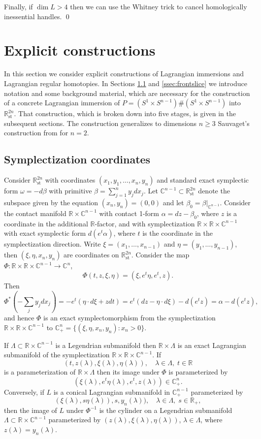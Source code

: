 \documentclass[reqno,11pt]{amsart}
\numberwithin{equation}{section}
\theoremstyle{my}
\theoremstyle{my}
\theoremstyle{your}
\newcommand{\R}{\mathbb{R}}
\newcommand{\C}{\mathbb{C}}
\newcommand{\st}{\mathrm{st}}
\begin{document}
Finally, if $\dim L > 4$ then we can use the Whitney trick to cancel homologically inessential handles.
\qed

\appendix
\section{Explicit constructions}\label{Sec:explicit}
In this section we consider explicit constructions of  Lagrangian immersions and Lagrangian regular homotopies. In Sections \ref{ssec:symplcoord} and \ref{ssec:frontslice} we introduce notation and some background material, which are necessary for the construction of a concrete Lagrangian immersion of $P=(S^{1}\times S^{n-1})\#(S^{1}\times S^{n-1})$ into $\R^{2n}_{\st}$. That construction, which is broken down into five stages, is given in the subsequent sections.  The construction generalizes  to dimensions $n\geq 3$ Sauvaget's construction from \cite{Sauvaget} for $n=2$. 


\subsection{Symplectization coordinates}\label{ssec:symplcoord}
Consider $\R^{2n}_\st$ with coordinates $(x_1,y_1,\dots, x_n,y_n)$ and standard exact symplectic form $\omega = -d\beta$ with primitive $\beta=\sum_{j=1}^{n} y_j dx_j$. Let $\C^{n-1}\subset \R^{2n}_\st$ denote the subspace given by the equation $(x_n,y_n)=(0,0)$ and let $\beta_0=\beta|_{\C^{n-1}}$. Consider the contact manifold $\R\times\C^{n-1}$ with contact 1-form $\alpha=dz-\beta_0$, where $z$ is a coordinate in the additional $\R$-factor, and with symplectization $\R\times\R\times\C^{n-1}$ with exact symplectic form $d(e^{t}\alpha)$, where $t$ is the coordinate in the symplectization direction. Write $\xi=(x_1,\dots,x_{n-1})$ and $\eta=(y_1,\dots,y_{n-1})$, then $(\xi,\eta,x_n,y_n)$ are coordinates on $\R^{2n}_\st$. Consider the map $\Phi\colon \R\times\R\times\C^{n-1}\to\C^{n}$,
\[
\Phi(t,z,\xi,\eta)=(\xi,e^{t}\eta,e^t,z).
\]
Then
\[
\Phi^{\ast}(-\sum_{j}y_jdx_j)=-e^{t}(\eta\cdot d\xi +zdt)=e^{t}(dz-\eta\cdot d\xi)-d(e^{t}z)=\alpha-d(e^{t}z),
\] 
and hence $\Phi$ is an exact symplectomorphism from the symplectization $\R\times\R\times\C^{n-1}$ to $\C^{n}_{+}=\{(\xi,\eta,x_n,y_n)\colon x_n>0\}$. 

If $\Lambda\subset \R\times\C^{n-1}$ is a Legendrian submanifold then $\R\times\Lambda$ is an exact Lagrangian submanifold of the symplectization $\R\times\R\times\C^{n-1}$. If 
\[
(t,z(\lambda),\xi(\lambda),\eta(\lambda)),\quad \lambda\in\Lambda,\; t\in\R
\]
is a parameterization of $\R\times\Lambda$ then its image under $\Phi$ is parameterized by
\[
(\xi(\lambda),e^{t}\eta(\lambda),e^{t},z(\lambda))\in\C^{n}_{+}.
\]    
Conversely, if $L$ is a conical Lagrangian submanifold in $\C^{n-1}_{+}$ parameterized by
\[
(\xi(\lambda),s\eta(\lambda)),s,y_n(\lambda)),\quad \lambda\in\Lambda,\; s\in\R_{+},
\]
then the image of $L$ under $\Phi^{-1}$ is  the cylinder on a Legendrian submanifold $\Lambda\subset\R\times\C^{n-1}$ parameterized by $(z(\lambda),\xi(\lambda),\eta(\lambda))$, $\lambda\in\Lambda$, where $z(\lambda)=y_n(\lambda)$.
\end{document}
